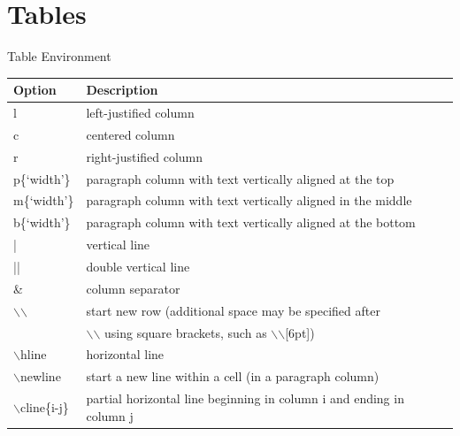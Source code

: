 \documentclass[10pt,xcolor=table]{beamer}
\begin{document}
\section{Tables}
\begin{frame}{Table Environment}

\begin{table}
\begin{tabular}{ll} \hline
\textbf{Option} & \textbf{Description} \\ \hline
l  &	left-justified column \\
c  &	centered column  \\
r  &	right-justified column  \\
p\{`width'\} &	paragraph column with text vertically aligned at the top  \\
m\{`width'\} & 	paragraph column with text vertically aligned in the middle \\
b\{`width'\} &	paragraph column with text vertically aligned at the bottom  \\
| &	vertical line   \\
|| &	double vertical line  \\
\& & 	column separator \\
$\backslash$$\backslash$ &	start new row (additional space may be specified after \\[6pt] & $\backslash$$\backslash$ using square brackets, \newline such as $\backslash$$\backslash$[6pt]) \\
$\backslash$hline &	horizontal line \\
$\backslash$newline & 	start a new line within a cell (in a paragraph column) \\
$\backslash$cline\{i-j\} & 	partial horizontal line beginning in column i and ending in column j \\ \hline
\end{tabular}
\end{table}
\end{frame}
\end{document}
